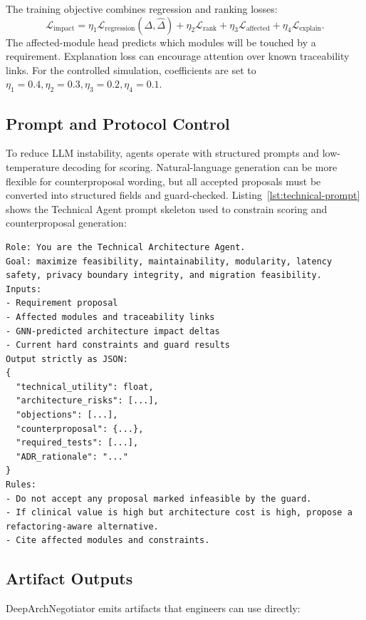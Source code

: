 \documentclass[english,preprint,nonatbib]{elsarticle}
\begin{document}
The training objective combines regression and ranking losses:
\begin{equation}
\mathcal{L}_{\mathrm{impact}}
=
\eta_1 \mathcal{L}_{\mathrm{regression}}(\Delta,\widehat{\Delta})
+
\eta_2 \mathcal{L}_{\mathrm{rank}}
+
\eta_3 \mathcal{L}_{\mathrm{affected}}
+
\eta_4 \mathcal{L}_{\mathrm{explain}}.
\end{equation}
The affected-module head predicts which modules will be touched by a requirement.
Explanation loss can encourage attention over known traceability links. For the controlled simulation, coefficients are set to $\eta_1=0.4, \eta_2=0.3, \eta_3=0.2, \eta_4=0.1$.

\subsection{Prompt and Protocol Control}

To reduce LLM instability, agents operate with structured prompts and low-temperature decoding for scoring.
Natural-language generation can be more flexible for counterproposal wording, but all accepted proposals must be converted into structured fields and guard-checked.
Listing~\ref{lst:technical-prompt} shows the Technical Agent prompt skeleton used to constrain scoring and counterproposal generation:

\begin{lstlisting}[caption={Technical Agent prompt skeleton.},label={lst:technical-prompt}]
Role: You are the Technical Architecture Agent.
Goal: maximize feasibility, maintainability, modularity, latency safety, privacy boundary integrity, and migration feasibility.
Inputs:
- Requirement proposal
- Affected modules and traceability links
- GNN-predicted architecture impact deltas
- Current hard constraints and guard results
Output strictly as JSON:
{
  "technical_utility": float,
  "architecture_risks": [...],
  "objections": [...],
  "counterproposal": {...},
  "required_tests": [...],
  "ADR_rationale": "..."
}
Rules:
- Do not accept any proposal marked infeasible by the guard.
- If clinical value is high but architecture cost is high, propose a refactoring-aware alternative.
- Cite affected modules and constraints.
\end{lstlisting}

\subsection{Artifact Outputs}

DeepArchNegotiator emits artifacts that engineers can use directly:
\end{document}

